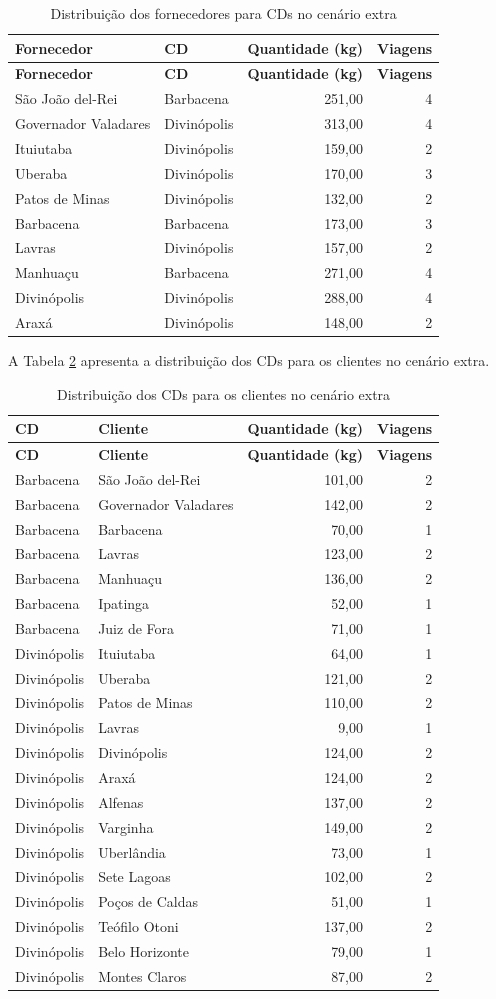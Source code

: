 \documentclass[a4paper,11pt]{article}
\begin{document}
\begin{longtable}{llrr}
\caption{Distribuição dos fornecedores para CDs no cenário extra}
\label{tab:cenario_extra_fornecedor_cd}\tabularnewline
\hline
\textbf{Fornecedor} & \textbf{CD} & \textbf{Quantidade (kg)} & \textbf{Viagens} \tabularnewline
\hline
\endfirsthead
\hline
\textbf{Fornecedor} & \textbf{CD} & \textbf{Quantidade (kg)} & \textbf{Viagens} \tabularnewline
\hline
\endhead
São João del-Rei & Barbacena & 251,00 & 4 \tabularnewline
Governador Valadares & Divinópolis & 313,00 & 4 \tabularnewline
Ituiutaba & Divinópolis & 159,00 & 2 \tabularnewline
Uberaba & Divinópolis & 170,00 & 3 \tabularnewline
Patos de Minas & Divinópolis & 132,00 & 2 \tabularnewline
Barbacena & Barbacena & 173,00 & 3 \tabularnewline
Lavras & Divinópolis & 157,00 & 2 \tabularnewline
Manhuaçu & Barbacena & 271,00 & 4 \tabularnewline
Divinópolis & Divinópolis & 288,00 & 4 \tabularnewline
Araxá & Divinópolis & 148,00 & 2 \tabularnewline
\hline
\end{longtable}

A Tabela \ref{tab:cenario_extra_cd_cliente} apresenta a distribuição dos CDs para os clientes no cenário extra.

\begin{longtable}{llrr}
\caption{Distribuição dos CDs para os clientes no cenário extra}
\label{tab:cenario_extra_cd_cliente}\tabularnewline
\hline
\textbf{CD} & \textbf{Cliente} & \textbf{Quantidade (kg)} & \textbf{Viagens} \tabularnewline
\hline
\endfirsthead
\hline
\textbf{CD} & \textbf{Cliente} & \textbf{Quantidade (kg)} & \textbf{Viagens} \tabularnewline
\hline
\endhead
Barbacena & São João del-Rei & 101,00 & 2 \tabularnewline
Barbacena & Governador Valadares & 142,00 & 2 \tabularnewline
Barbacena & Barbacena & 70,00 & 1 \tabularnewline
Barbacena & Lavras & 123,00 & 2 \tabularnewline
Barbacena & Manhuaçu & 136,00 & 2 \tabularnewline
Barbacena & Ipatinga & 52,00 & 1 \tabularnewline
Barbacena & Juiz de Fora & 71,00 & 1 \tabularnewline
Divinópolis & Ituiutaba & 64,00 & 1 \tabularnewline
Divinópolis & Uberaba & 121,00 & 2 \tabularnewline
Divinópolis & Patos de Minas & 110,00 & 2 \tabularnewline
Divinópolis & Lavras & 9,00 & 1 \tabularnewline
Divinópolis & Divinópolis & 124,00 & 2 \tabularnewline
Divinópolis & Araxá & 124,00 & 2 \tabularnewline
Divinópolis & Alfenas & 137,00 & 2 \tabularnewline
Divinópolis & Varginha & 149,00 & 2 \tabularnewline
Divinópolis & Uberlândia & 73,00 & 1 \tabularnewline
Divinópolis & Sete Lagoas & 102,00 & 2 \tabularnewline
Divinópolis & Poços de Caldas & 51,00 & 1 \tabularnewline
Divinópolis & Teófilo Otoni & 137,00 & 2 \tabularnewline
Divinópolis & Belo Horizonte & 79,00 & 1 \tabularnewline
Divinópolis & Montes Claros & 87,00 & 2 \tabularnewline
\hline
\end{longtable}
\end{document}
